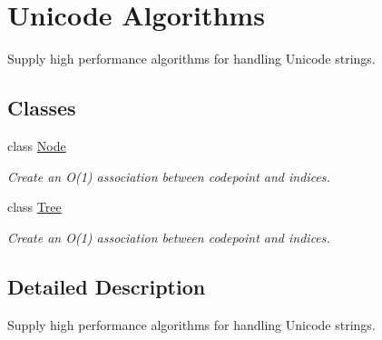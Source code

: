 \hypertarget{group__jlettvin}{}\section{Unicode Algorithms}
\label{group__jlettvin}


Supply high performance algorithms for handling Unicode strings.  


\subsection*{Classes}
\begin{DoxyCompactItemize}
\item 
class \hyperlink{class_node}{Node}
\begin{DoxyCompactList}\small\item\em Create an O(1) association between codepoint and indices. \end{DoxyCompactList}\item 
class \hyperlink{class_tree}{Tree}
\begin{DoxyCompactList}\small\item\em Create an O(1) association between codepoint and indices. \end{DoxyCompactList}\end{DoxyCompactItemize}


\subsection{Detailed Description}
Supply high performance algorithms for handling Unicode strings. 

